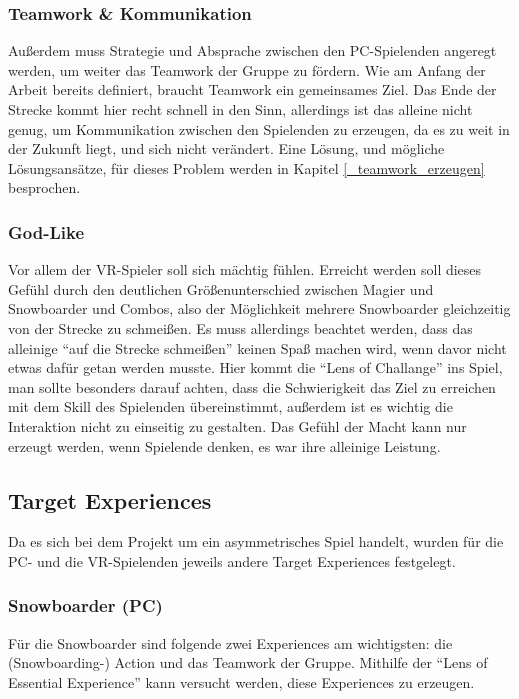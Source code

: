 \subsubsection{Teamwork \& Kommunikation}
Außerdem muss Strategie und Absprache zwischen den PC-Spielenden angeregt werden, um weiter das Teamwork der Gruppe zu fördern. Wie am Anfang der Arbeit bereits definiert, braucht Teamwork ein gemeinsames Ziel. Das Ende der Strecke kommt hier recht schnell in den Sinn, allerdings ist das alleine nicht genug, um Kommunikation zwischen den Spielenden zu erzeugen, da es zu weit in der Zukunft liegt, und sich nicht verändert. Eine Lösung, und mögliche Lösungsansätze, für dieses Problem werden in Kapitel \ref{_teamwork_erzeugen} besprochen.

\subsubsection{God-Like}
Vor allem der VR-Spieler soll sich mächtig fühlen. Erreicht werden soll dieses Gefühl durch den deutlichen Größenunterschied zwischen Magier und Snowboarder und Combos, also der Möglichkeit mehrere Snowboarder gleichzeitig von der Strecke zu schmeißen. Es muss allerdings beachtet werden, dass das alleinige "`auf die Strecke schmeißen"' keinen Spaß machen wird, wenn davor nicht etwas dafür getan werden musste. Hier kommt die "`Lens of Challange"'\cite{_art_of_gamedesign} ins Spiel, man sollte besonders darauf achten, dass die Schwierigkeit das Ziel zu erreichen mit dem Skill des Spielenden übereinstimmt, außerdem ist es wichtig die Interaktion nicht zu einseitig zu gestalten. Das Gefühl der Macht kann nur erzeugt werden, wenn Spielende denken, es war ihre alleinige Leistung.

\subsection{Target Experiences}

Da es sich bei dem Projekt um ein asymmetrisches Spiel handelt, wurden für die PC- und die VR-Spielenden jeweils andere Target Experiences festgelegt.

\subsubsection{Snowboarder (PC)}
Für die Snowboarder sind folgende zwei Experiences am wichtigsten: die (Snowboarding-) Action und das Teamwork der Gruppe. Mithilfe der "`Lens of Essential Experience"'\cite[S. 55]{_art_of_gamedesign} kann versucht werden, diese Experiences zu erzeugen.

